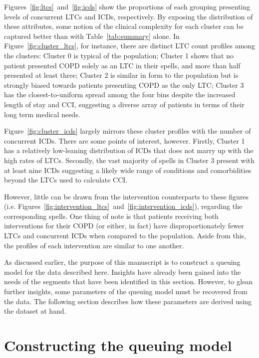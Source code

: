 \documentclass[]{interact}
\theoremstyle{plain}%
\theoremstyle{definition}
\theoremstyle{remark}
\begin{document}
Figures~\ref{fig:ltcs}~and~\ref{fig:icds} show the proportions of each grouping
presenting levels of concurrent LTCs and ICDs, respectively. By exposing the
distribution of these attributes, some notion of the clinical complexity for
each cluster can be captured better than with Table~\ref{tab:summary} alone. In
Figure~\ref{fig:cluster_ltcs}, for instance, there are distinct LTC count
profiles among the clusters: Cluster 0 is typical of the population; Cluster 1
shows that no patient presented COPD solely as an LTC in their spells, and more
than half presented at least three; Cluster 2 is similar in form to the
population but is strongly biased towards patients presenting COPD as the only
LTC; Cluster 3 has the closest-to-uniform spread among the four bins despite the
increased length of stay and CCI, suggesting a diverse array of patients in
terms of their long term medical needs.

Figure~\ref{fig:cluster_icds} largely mirrors these cluster profiles with the
number of concurrent ICDs. There are some points of interest, however. Firstly,
Cluster 1 has a relatively low-leaning distribution of ICDs that does not marry
up with the high rates of LTCs. Secondly, the vast majority of spells in Cluster
3 present with at least nine ICDs suggesting a likely wide range of conditions
and comorbidities beyond the LTCs used to calculate CCI.\

However, little can be drawn from the intervention counterparts to these figures
(i.e. Figures~\ref{fig:intervention_ltcs}~and~\ref{fig:intervention_icds}),
regarding the corresponding spells. One thing of note is that patients receiving
both interventions for their COPD (or either, in fact) have disproportionately
fewer LTCs and concurrent ICDs when compared to the population. Aside from this,
the profiles of each intervention are similar to one another.

As discussed earlier, the purpose of this manuscript is to construct a queuing
model for the data described here. Insights have already been gained into the
needs of the segments that have been identified in this section. However, to
glean further insights, some parameters of the queuing model must be recovered
from the data. The following section describes how these parameters are derived
using the dataset at hand.


\section{Constructing the queuing model}\label{sec:model}
\end{document}
